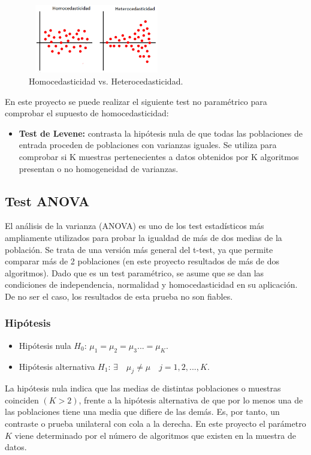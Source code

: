 \begin{figure}[h]
\centering
\includegraphics[width=6cm,height=3cm]{figuras/homocedasticidad.png}
\caption{Homocedasticidad vs. Heterocedasticidad.}
\label{fig:homocedasticidad}
\end{figure}

En este proyecto se puede realizar el siguiente test no paramétrico para comprobar el supuesto de homocedasticidad:

\begin{itemize}
\item \textbf{Test de Levene:} contrasta la hipótesis nula de que todas las poblaciones de entrada proceden de
poblaciones con varianzas iguales. Se utiliza para comprobar si K muestras pertenecientes a datos obtenidos por
K algoritmos presentan o no homogeneidad de varianzas. 
\end{itemize}


\subsection{Test ANOVA}
El análisis de la varianza (ANOVA) es uno de los test estadísticos más ampliamente utilizados para probar
la igualdad de más de dos medias de la población. Se trata de una versión más general del t-test, ya que permite
comparar más de 2 poblaciones (en este proyecto resultados de más de dos algoritmos). Dado que es un test
paramétrico, se asume que se dan las condiciones de independencia, normalidad y homocedasticidad en su
aplicación. De no ser el caso, los resultados de esta prueba no son fiables.

\subsubsection{Hipótesis}
\begin{itemize}
\item Hipótesis nula $H_0$: $\mu_1 = \mu_2 = \mu_3 ... = \mu_K$.
\item Hipótesis alternativa $H_1$: $\exists \quad \mu_j \neq \mu \quad j=1,2,...,K$.
\end{itemize}
La hipótesis nula indica que las medias de distintas poblaciones o muestras coinciden $(K>2)$, frente a la
hipótesis alternativa de que por lo menos una de las poblaciones tiene una media que difiere de las demás. Es,
por tanto, un contraste o prueba unilateral con cola a la derecha. En este proyecto el parámetro $K$ viene
determinado por el número de algoritmos que existen en la muestra de datos.

